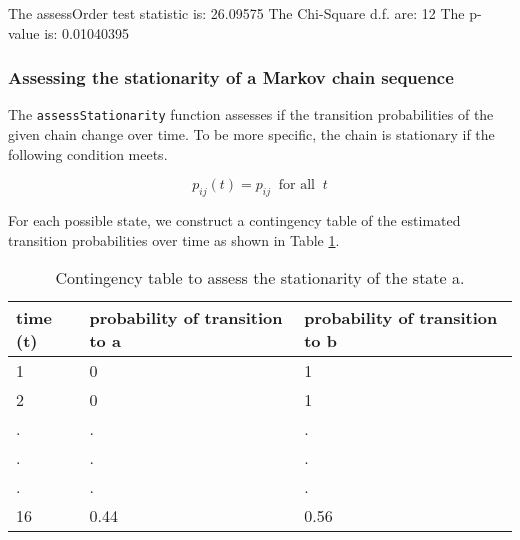 \documentclass[article,nojss]{jss}
\begin{document}
\begin{CodeChunk}



\begin{CodeOutput}
The assessOrder test statistic is:  26.09575 
The Chi-Square d.f. are:  12 
The p-value is:  0.01040395 
\end{CodeOutput}
\end{CodeChunk}

\hypertarget{assessing-the-stationarity-of-a-markov-chain-sequence}{%
\subsubsection{Assessing the stationarity of a Markov chain sequence}\label{assessing-the-stationarity-of-a-markov-chain-sequence}}

The \texttt{assessStationarity} function assesses if the transition probabilities of the given chain change over time. To be more specific, the chain is stationary if the following condition meets.

\begin{equation}
p_{ij}(t) = p_{ij} ~\textrm{ for all }~t
\label{eq:stationarity}
\end{equation}

For each possible state, we construct a contingency table of the estimated transition probabilities over time as shown in Table \ref{tab:stationarity}.

\begin{table}[h]
  \centering
  \begin{tabular}{l | l | l}
    \hline
  time (t) & probability of transition to a & probability of transition to b \\
    \hline  \hline
  1 & 0 & 1\\
  2 & 0 & 1\\
  . & . & . \\
  . & . & . \\
  . & . & . \\
  16 & 0.44 & 0.56\\
  \hline
\end{tabular}
\caption{Contingency table to assess the stationarity of the state a.}
\label{tab:stationarity}
\end{table}
\end{document}
